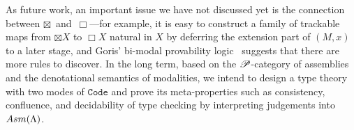\documentclass[a4paper,UKenglish,numberwithinsect,cleveref,thm-restate,draft]{lipics-v2021}
\numberwithin{equation}{section}
\theoremstyle{definition}
\theoremstyle{plain}
\begin{document}
As future work, an important issue we have not discussed yet is the connection between $\boxtimes$~and~$\Box$---for example, it is easy to construct a family of trackable maps from $\boxtimes X$ to $\Box X$ natural in $X$ by deferring the extension part of $(M, x)$ to a later stage, and Goris' bi-modal provability logic~\cite{Goris2009} suggests that there are more rules to discover.
In the long term, based on the $\mathscr{P}$-category of assemblies and the denotational semantics of modalities, we intend to design a type theory with two modes of $\mathtt{Code}$ and prove its meta-properties such as consistency, confluence, and decidability of type checking by interpreting judgements into~$\Asm(\Lambda)$.

%


%
\end{document}
